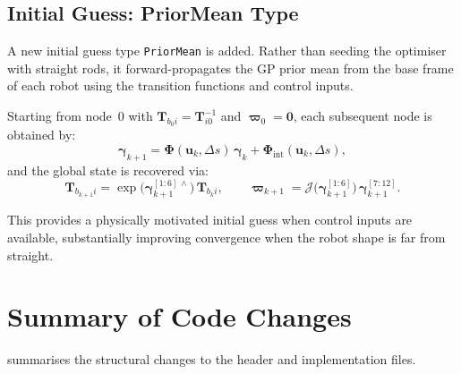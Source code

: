 \documentclass[11pt,a4paper]{article}
\newcommand{\Jac}{\mathcal{J}}
\newcommand{\inv}{^{-1}}
\newcommand{\T}{\mathbf{T}}
\newcommand{\bvarpi}{\bm{\varpi}}
\newcommand{\bgamma}{\bm{\gamma}}
\newcommand{\bPhi}{\bm{\Phi}}
\newcommand{\bzero}{\mathbf{0}}
\begin{document}
\subsection{Initial Guess: PriorMean Type}
\label{sec:priormean}

A new initial guess type \texttt{PriorMean} is added.
Rather than seeding the optimiser with straight rods, it forward-propagates the GP prior mean from the base frame of each robot using the transition functions and control inputs.

Starting from node~0 with $\T_{b_0 i} = \T_{i0}\inv$ and $\bvarpi_0 = \bzero$, each subsequent node is obtained by:
\begin{equation}
    \bgamma_{k+1} = \bPhi(\mathbf{u}_k, \Delta s)\,\bgamma_k + \bPhi_{\mathrm{int}}(\mathbf{u}_k, \Delta s),
\end{equation}
and the global state is recovered via:
\begin{equation}
    \T_{b_{k+1} i} = \exp\!\bigl(\bgamma_{k+1}^{[1:6]\,\wedge}\bigr)\,\T_{b_k i}, \qquad
    \bvarpi_{k+1} = \Jac\!\bigl(\bgamma_{k+1}^{[1:6]}\bigr)\,\bgamma_{k+1}^{[7:12]}.
\end{equation}

This provides a physically motivated initial guess when control inputs are available, substantially improving convergence when the robot shape is far from straight.

\section{Summary of Code Changes}
\label{sec:code-changes}

 summarises the structural changes to the header and implementation files.
\end{document}

